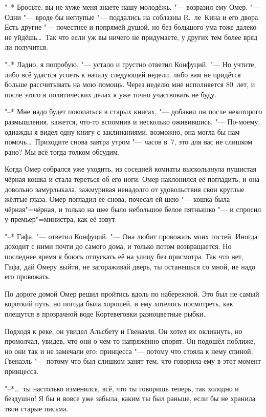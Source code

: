 "--* Бросьте, вы не хуже меня знаете нашу молодёжь, "--- возразил ему Омер.
"--- Одни "--- вроде бы неглупые "--- поддались на соблазны R.~ле~Кина и его
двора.
Есть другие "--- почестнее и попрямей душой, но без большого ума тоже далеко не
уйдёшь\ldots\
Так что если уж вы ничего не придумаете, у других тем более вряд ли получится.

"--* Ладно, я попробую, "--- устало и грустно ответил Конфуций.
"--- Но учтите, либо всё удастся успеть к началу следующей недели, либо вам не
придётся больше рассчитывать на мою помощь.
Через неделю мне исполняется 80~лет, и после этого в политических делах я уже
точно участвовать не буду.

"--* Мне надо будет покопаться в старых книгах, "--- добавил он после некоторого
размышления, кажется, что-то вспомнив и несколько оживившись.
"--- По-моему, однажды я видел одну книгу с заклинаниями, возможно, она могла бы
нам помочь\ldots\
Приходите снова завтра утром "--- часов в~7, это для вас не слишком рано?
Мы всё тогда толком обсудим.

Когда Омер собрался уже уходить, из соседней комнаты выскользнула пушистая
чёрная кошка и стала тереться об его ноги.
Омер наклонился её погладить, и она довольно замурлыкала, зажмуривая ненадолго
от удовольствия свои круглые жёлтые глаза.
Омер погладил её снова, почесал ей шею "--- кошка была чёрная"=чёрная, и только
на шее было небольшое белое пятнышко "--- и спросил у премьер"=министра, как её
зовут.

"--* Гафа, "--- ответил Конфуций.
"--- Она любит провожать моих гостей.
Иногда доходит с ними почти до самого дома, и только потом возвращается.
Но последнее время я боюсь отпускать её на улицу без присмотра.
Так что нет, Гафа, дай Омеру выйти, не загораживай дверь, ты останешься со мной,
не надо его провожать.

По дороге домой Омер решил пройтись вдоль по набережной.
Это был не самый короткий путь, но погода была хорошей, и ему хотелось
посмотреть, как плещутся в прозрачной воде Кортевеговки разноцветные рыбки.

Подходя к реке, он увидел Альсбету и Гвенаэля.
Он хотел их окликнуть, но промолчал, увидев, что они о чём-то напряжённо спорят.
Он подошёл поближе, но они так и не замечали его: принцесса "--- потому что
стояла к нему спиной, Гвенаэль "--- потому что был слишком занят тем, что
говорила ему в этот момент принцесса.

"--*\ldots\ ты настолько изменился, всё, что ты говоришь теперь, так холодно
и бездушно!
Я бы и вовсе уже забыла, каким ты был раньше, если бы не хранила твои старые
письма.

